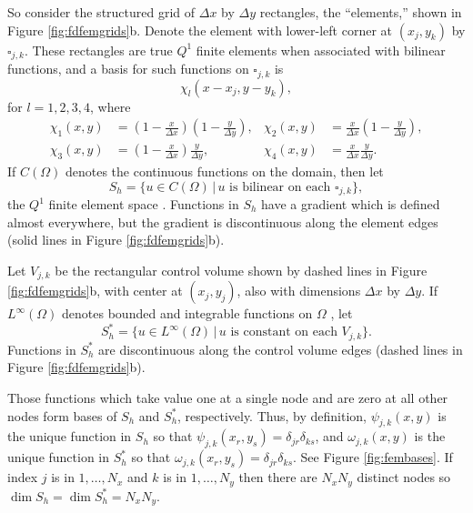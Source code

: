 \documentclass[twocolumn]{igs}
\begin{document}
So consider the structured grid of $\Delta x$ by $\Delta y$ rectangles, the ``elements,'' shown in Figure \ref{fig:fdfemgrids}b.  Denote the element with lower-left corner at $(x_j,y_k)$ by $\square_{j,k}$.  These rectangles are true $Q^1$ finite elements when associated with bilinear functions, and a basis for such functions on $\square_{j,k}$ is
\begin{equation}
\chi_l(x-x_j,y-y_k), \label{eq:elementbasis}
\end{equation}
for $l=1,2,3,4$, where
\begin{align*}
\chi_1(x,y) &= \left(1-\frac{x}{\Delta x}\right) \left(1-\frac{y}{\Delta y}\right), & \chi_2(x,y) &= \frac{x}{\Delta x} \left(1-\frac{y}{\Delta y}\right), \\
\chi_3(x,y) &= \left(1-\frac{x}{\Delta x}\right) \frac{y}{\Delta y}, & \chi_4(x,y) &= \frac{x}{\Delta x} \frac{y}{\Delta y}. 
\end{align*}
If $C(\Omega)$ denotes the continuous functions on the domain, then let
\begin{equation}
S_h = \{u \in C(\Omega) \,\big|\, u \text{ is bilinear on each $\square_{j,k}$}\},
\end{equation}
the $Q^1$ finite element space \cite{Elmanetal2005}.  Functions in $S_h$ have a gradient which is defined almost everywhere, but the gradient is discontinuous along the element edges (solid lines in Figure \ref{fig:fdfemgrids}b).

Let $V_{j,k}$ be the rectangular control volume shown by dashed lines in Figure \ref{fig:fdfemgrids}b, with center at $(x_j,y_j)$, also with dimensions $\Delta x$ by $\Delta y$.  If $L^\infty(\Omega)$ denotes bounded and integrable functions on $\Omega$ \cite{Evans}, let
\begin{equation}
S_h^* = \{u \in L^\infty(\Omega) \,\big|\, u \text{ is constant on each $V_{j,k}$}\}.
\end{equation}
Functions in $S_h^*$ are discontinuous along the control volume edges (dashed lines in Figure \ref{fig:fdfemgrids}b).

Those functions which take value one at a single node and are zero at all other nodes form bases of $S_h$ and $S_h^*$, respectively.  Thus, by definition, $\psi_{j,k}(x,y)$ is the unique function in $S_h$ so that $\psi_{j,k}(x_r,y_s) = \delta_{jr} \delta_{ks}$, and $\omega_{j,k}(x,y)$ is the unique function in $S_h^*$  so that $\omega_{j,k}(x_r,y_s) = \delta_{jr} \delta_{ks}$.  See Figure \ref{fig:fembases}.  If index $j$ is in $1,\dots,N_x$ and $k$ is in $1,\dots,N_y$ then there are $N_xN_y$ distinct nodes so $\dim S_h = \dim S_h^* = N_x N_y$.  
\end{document}
